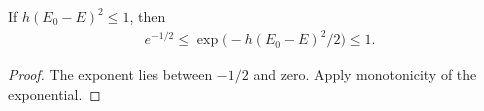 \begin{lemma}
    \label{thm:huang_gaussian_ground_amplitude}
    \leanok
    If $h(E_0-E)^2\le1$, then
    \begin{align}
        e^{-1/2}\le\exp\bigl(-h(E_0-E)^2/2\bigr)\le1.
    \end{align}
\end{lemma}
\begin{proof}
    \leanok
    The exponent lies between $-1/2$ and zero. Apply monotonicity of the
    exponential.
\end{proof}

